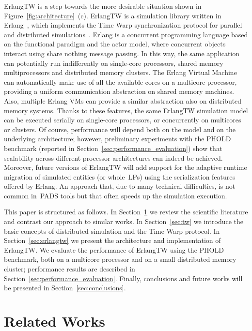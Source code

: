 \documentclass{sigplanconf}
\begin{document}
ErlangTW is a step towards the more desirable situation shown in
Figure~\ref{fig:architecture}~(c). ErlangTW is a simulation library
written in Erlang~\cite{Armstrong07}, which implements the Time Warp
synchronization protocol for parallel and distributed
simulations~\cite{Jef85}. Erlang is a concurrent programming language
based on the functional paradigm and the actor model, where concurrent
objects interact using share nothing message passing. In this way, the
same application can potentially run indifferently on single-core
processors, shared memory multiprocessors and distributed memory
clusters. The Erlang Virtual Machine can automatically make use of all
the available cores on a multicore processor, providing a uniform
communication abstraction on shared memory machines. Also, multiple
Erlang VMs can provide a similar abstraction also on distributed
memory systems. Thanks to these features, the same ErlangTW simulation
model can be executed serially on single-core processors, or
concurrently on multicores or clusters. Of course, performance will
depend both on the model and on the underlying architecture; however,
preliminary experiments with the PHOLD benchmark (reported in
Section~\ref{sec:performance_evaluation}) show that scalability across
different processor architectures can indeed be achieved.  Moreover,
future versions of ErlangTW will add support for the adaptive runtime
migration of simulated entities (or whole~\acp{LP}) using the
serialization features offered by Erlang. An approach that, due to
many technical difficulties, is not common in~\ac{PADS} tools but that
often speeds up the simulation execution.

This paper is structured as follows. In
Section~\ref{sec:related_works} we review the scientific literature
and contrast our approach to similar works. In Section~\ref{sec:tw} we
introduce the basic concepts of distributed simulation and the Time
Warp protocol. In Section~\ref{sec:erlangtw} we present the
architecture and implementation of ErlangTW. We evaluate the
performance of ErlangTW using the PHOLD benchmark, both on a
multicore processor and on a small distributed memory cluster;
performance results are described in
Section~\ref{sec:performance_evaluation}. Finally, conclusions and
future works will be presented in Section~\ref{sec:conclusions}.

\section{Related Works}\label{sec:related_works}
\end{document}
